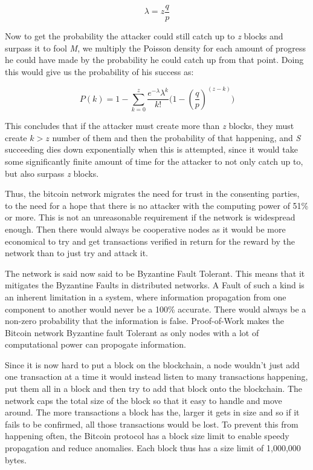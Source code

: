 \documentclass[12pt,a4paper]{report}
\begin{document}
\begin{justify}
\begin{equation*} 
  \lambda = z\frac{q}{p}
\end{equation*}
\newline

Now to get the probability the attacker could still catch up to \textit{z} blocks and  surpass it to fool \textit{M}, we multiply the Poisson density for each amount of progress he could have made by the probability he could catch up from that point. Doing this would give us the probability of his success as: \cite{Satoshi}

\begin{equation*} 
P\left( k \right) =1-\sum_{k=0}^{z} \frac{{e^{ - \lambda } \lambda ^k }}{{k!}}\Bigg(1-\left(\dfrac{q}{p}\right)^{(z-k)}\Bigg)

\end{equation*}

This concludes that if the attacker must create more than \textit{z} blocks, they must create $k>z$ number of them and then the probability of that happening, and \textit{S} succeeding dies down exponentially when this is attempted, since it would take some significantly finite amount of time for the attacker to not only catch up to, but also surpass \textit{z} blocks. 
\vspace{5mm}

Thus, the bitcoin network migrates the need for trust in the consenting parties, to the need for a hope that there is no attacker with the computing power of 51\% or more. This is not an unreasonable requirement if the network is widespread enough. Then there would always be cooperative nodes as it would be more economical to try and get transactions verified in return for the reward by the network than to just try and attack it.
\vspace{7mm}

The network is said now said to be Byzantine Fault Tolerant. This means that it mitigates the Byzantine Faults in distributed networks. A Fault of such a kind is an inherent limitation in a system, where information propagation from one component to another would never be a 100\% accurate. There would always be a non-zero probability that the information is false. Proof-of-Work makes the Bitcoin network Byzantine fault Tolerant as only nodes with a lot of computational power can propogate information.
\vspace{7mm}

Since it is now hard to put a block on the blockchain, a node wouldn't just add one transaction at a time it would instead listen to many transactions happening, put them all in a block and then try to add that block onto the blockchain. The network caps the total size of the block so that it easy to handle and move around.
\newline
The more transactions a block has the, larger it gets in size and so if it fails to be confirmed, all those transactions would be lost. To prevent this from happening often, the Bitcoin protocol has a block size limit to enable speedy propagation and reduce anomalies. Each block thus has a size limit of 1,000,000 bytes.


\end{justify}
\end{document}
